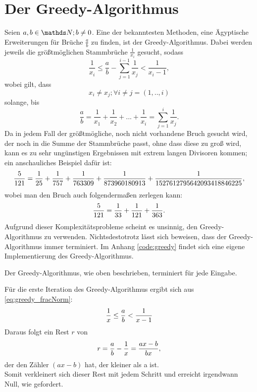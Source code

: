 \section{Der Greedy-Algorithmus}
Seien $a, b \in \N; b \neq 0$. Eine der bekanntesten Methoden, eine Ägyptische Erweiterungen für Brüche $\frac{a}{b}$ zu finden, ist der Greedy-Algorithmus. Dabei werden jeweils die größtmöglichen Stammbrüche $\frac{1}{x_i}$ gesucht, sodass
\begin{equation}\label{eq:greedy_fracNorm}
\frac{1}{x_i} \leq \frac{a}{b} - \sum_{j=1}^{i-1} \frac{1}{x_j} < \frac{1}{x_{i}-1},
\end{equation}
wobei gilt, dass
$$x_i \neq x_j; \forall i \neq j = (1,..,i)$$ 
solange, bis
$$\frac{a}{b} = \frac{1}{x_1} + \frac{1}{x_2} + ... + \frac{1}{x_i} = \sum_{j=1}^{i} \frac{1}{x_j}.$$
Da in jedem Fall der größtmögliche, noch nicht vorhandene Bruch gesucht wird, der noch in die Summe der Stammbrüche passt, ohne dass diese zu groß wird, kann es zu sehr ungünstigen Ergebnissen mit extrem langen Divisoren kommen; ein anschauliches Beispiel dafür ist:
$$\frac{5}{121} = \frac{1}{25} + \frac{1}{757} + \frac{1}{763309} + \frac{1}{873960180913} + \frac{1}{1527612795642093418846225},$$
wobei man den Bruch auch folgendermaßen zerlegen kann:
$$\frac{5}{121} = \frac{1}{33} + \frac{1}{121} + \frac{1}{363}.$$
Aufgrund dieser Komplexitätsprobleme scheint es unsinnig, den Greedy-Algorithmus zu verwenden. Nichtsdestotrotz lässt sich beweisen, dass der Greedy-Algorithmus immer terminiert.
Im Anhang \ref{code:greedy} findet sich eine eigene Implementierung des Greedy-Algorithmus.

\begin{satz}
	Der Greedy-Algorithmus, wie oben beschrieben, terminiert für jede Eingabe.
\end{satz}
\begin{bew}
	Für die erste Iteration des Greedy-Algorithmus ergibt sich aus \ref{eq:greedy_fracNorm}:
	\begin{equation*}
		\frac{1}{x} \leq \frac{a}{b} < \frac{1}{x-1}
	\end{equation*}
	Daraus folgt ein Rest $r$ von
	$$ r = \frac{a}{b}-\frac{1}{x} = \frac{ax-b}{bx},$$
	der den Zähler $(ax-b)$ hat, der kleiner als a ist.\\ 
	Somit verkleinert sich dieser Rest mit jedem Schritt und erreicht irgendwann Null, wie gefordert.
\end{bew}